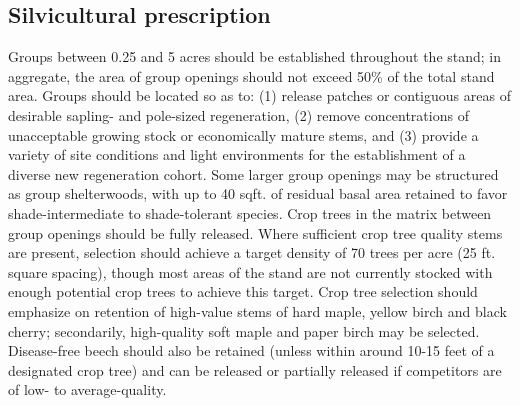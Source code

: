 \documentclass[]{tufte-handout}
\begin{document}
\subsection{Silvicultural
prescription}\label{silvicultural-prescription-1}

Groups between 0.25 and 5 acres should be established throughout the
stand; in aggregate, the area of group openings should not exceed 50\%
of the total stand area. Groups should be located so as to: (1) release
patches or contiguous areas of desirable sapling- and pole-sized
regeneration, (2) remove concentrations of unacceptable growing stock or
economically mature stems, and (3) provide a variety of site conditions
and light environments for the establishment of a diverse new
regeneration cohort. Some larger group openings may be structured as
group shelterwoods, with up to 40 sqft. of residual basal area retained
to favor shade-intermediate to shade-tolerant species. Crop trees in the
matrix between group openings should be fully released. Where sufficient
crop tree quality stems are present, selection should achieve a target
density of 70 trees per acre (25 ft. square spacing), though most areas
of the stand are not currently stocked with enough potential crop trees
to achieve this target. Crop tree selection should emphasize on
retention of high-value stems of hard maple, yellow birch and black
cherry; secondarily, high-quality soft maple and paper birch may be
selected. Disease-free beech should also be retained (unless within
around 10-15 feet of a designated crop tree) and can be released or
partially released if competitors are of low- to average-quality.

\newpage
\end{document}
